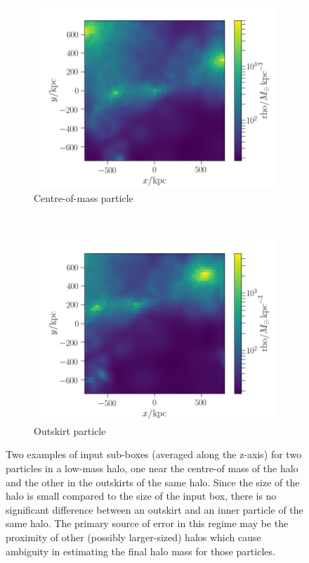 \documentclass[11pt]{article}
\begin{document}
\begin{figure}
    \centering
    \begin{subfigure}{0.5\textwidth}
        \centering
        \includegraphics[width=\textwidth]{z0/input_data_COM_particle_halo2000_wholesim}
        \caption{Centre-of-mass particle}
    \end{subfigure}%
    ~ 
    \begin{subfigure}{0.5\textwidth}
        \centering
        \includegraphics[width=\textwidth]{z0/input_data_outskirt_particle_halo2000_wholesim}
        \caption{Outskirt particle}
    \end{subfigure}
    \caption{Two examples of input sub-boxes (averaged along the z-axis) for two particles in a low-mass halo, one near the centre-of mass of the halo and the other in the outskirts of the same halo. Since the size of the halo is small compared to the size of the input box, there is no significant difference between an outskirt and an inner particle of the same halo. The primary source of error in this regime may be the proximity of other (possibly larger-sized) halos which cause ambiguity in estimating the final halo mass for those particles.}
    \label{low_mass_images}
\end{figure}
\end{document}
